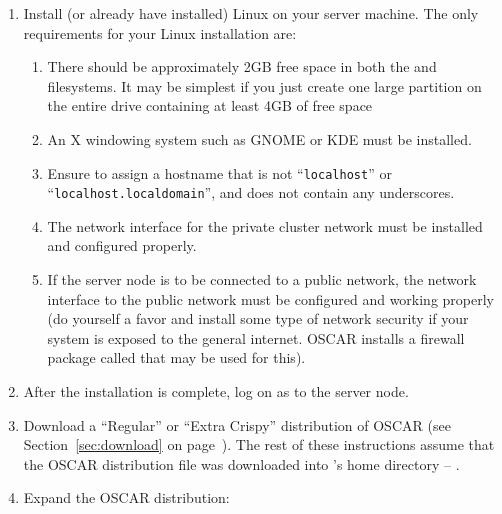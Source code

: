 \begin {enumerate}
\item Install (or already have installed) Linux on your server
  machine.  The only requirements for your Linux installation are:

  \begin{enumerate}
  \item There should be approximately 2GB free space in both the
    \file{/} and  filesystems. It may be simplest if you
    just create one large partition on the entire drive containing at
    least 4GB of free space
    
  \item An X windowing system such as GNOME or KDE must be installed.

\begchange
    
\item Ensure to assign a hostname that is not ``{\tt localhost}'' or
  ``{\tt localhost.localdomain}'', and does not contain any
  underscores.
    
  \item The network interface for the private cluster network must be
    installed and configured properly.
    
  \item If the server node is to be connected to a public network, the
    network interface to the public network must be configured and
    working properly (do yourself a favor and install some type of
    network security if your system is exposed to the general
    internet. OSCAR installs a firewall package called
     that may be used for this).

\endchange

  \end{enumerate}
  
  
\item After the installation is complete, log on as  to the
  server node.
  
\item Download a ``Regular'' or ``Extra Crispy'' distribution of OSCAR
  (see Section~\ref{sec:download} on page~\pageref{sec:download}).
  The rest of these instructions assume that the OSCAR distribution
  file was downloaded into 's home directory --
  .

\item Expand the OSCAR distribution:


\end{enumerate}
